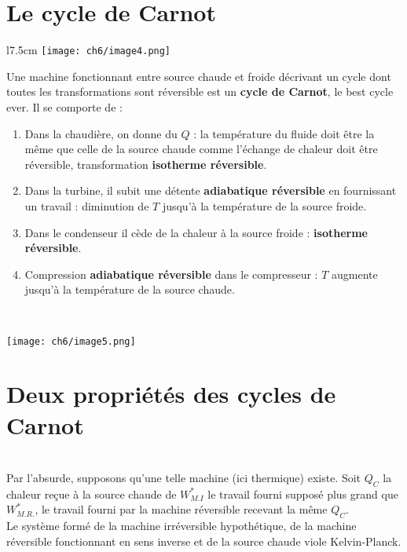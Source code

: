 	\section{Le cycle de Carnot}
	\begin{wrapfigure}[8]{l}{7.5cm}
	\vspace{5mm}
	\texttt{[image: ch6/image4.png]}
	\end{wrapfigure}
	Une machine fonctionnant entre source chaude et froide décrivant 
	un cycle dont toutes les transformations sont réversible est un 
	\textbf{cycle de Carnot}, le best cycle ever. Il se comporte de :
	\begin{enumerate}
	\item Dans la chaudière, on donne du $Q$ : la température du fluide 
	doit être la même que celle de la source chaude comme l'échange de chaleur
	doit être réversible, transformation \textbf{isotherme réversible}.
	\item Dans la turbine, il subit une détente \textbf{adiabatique réversible} 
	en fournissant un travail : diminution de $T$ jusqu'à la température 
	de la source froide.
	\item Dans le condenseur il cède de la chaleur à la source froide : 
	\textbf{isotherme réversible}.
	\item Compression \textbf{adiabatique réversible} dans le compresseur : $T$ 
	augmente jusqu'à la température de la source chaude.
	\end{enumerate}\ 
	\begin{center}
		\texttt{[image: ch6/image5.png]}
	\end{center}
	
	\section{Deux propriétés des cycles de Carnot}
	\ \\
	Par l'absurde, supposons qu'une telle machine (ici thermique) 
	existe. Soit $Q_C$ la chaleur reçue à la source chaude de $W_{M.I}^*$ 
	le travail fourni supposé plus grand que $W_{M.R.}^*$, le travail 
	fourni par la machine réversible recevant la même $Q_C$.\\
	Le système formé de la machine irréversible hypothétique, de la 
	machine réversible fonctionnant en sens inverse et de la source 
	chaude viole Kelvin-Planck.
	
